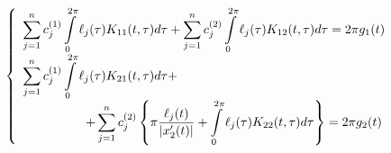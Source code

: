 \documentclass[14pt,a4paper]{extarticle}
\newcounter{e}
\numberwithin{equation}{section}
\numberwithin{figure}{section}
\newcommand{\intl}{\int\limits}
\newcommand{\inttwopi}{\intl_{0}^{2\pi}}
\begin{document}
 \begin{equation}
	 \label{coll-sys}
	 \left\{
	 \begin{array}{l}
	 	\displaystyle
	 	  \sum_{j=1}^{n} c^{(1)}_{j} \inttwopi \ell_{j}(\tau) K_{11}(t, \tau) d \tau
	 	+ \sum_{j=1}^{n} c^{(2)}_{j} \inttwopi \ell_{j}(\tau) K_{12}(t, \tau) d \tau
	 	= 2\pi g_{1}(t)
	 	\\ [0.3cm]
	 	
	 	\displaystyle
	 	  \sum_{j=1}^{n} c^{(1)}_{j} \inttwopi \ell_{j}(\tau) K_{21}(t, \tau) d \tau +
	 	\\ [0.3cm]
	 	
	 	\displaystyle
	 	\qquad \qquad \quad
	 	+ \sum_{j=1}^{n} c^{(2)}_{j} \left\{
	 	      \pi \frac{\ell_{j}(t)}{\abs{x'_{2}(t)}}
	 	    + \inttwopi \ell_{j}(\tau) K_{22}(t, \tau) d \tau
	 	  \right\}
	 	= 2\pi g_{2}(t)
	 \end{array}\right.
 \end{equation}
 
\end{document}
